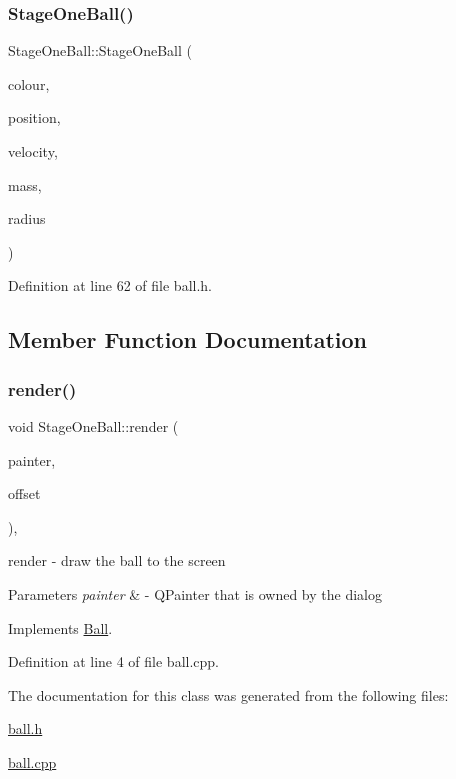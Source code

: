 \subsubsection{\texorpdfstring{Stage\+One\+Ball()}{StageOneBall()}}
{\footnotesize\ttfamily Stage\+One\+Ball\+::\+Stage\+One\+Ball (\begin{DoxyParamCaption}\item[{Q\+Color}]{colour,  }\item[{Q\+Vector2D}]{position,  }\item[{Q\+Vector2D}]{velocity,  }\item[{double}]{mass,  }\item[{int}]{radius }\end{DoxyParamCaption})\hspace{0.3cm}{\ttfamily [inline]}}



Definition at line 62 of file ball.\+h.



\subsection{Member Function Documentation}
\mbox{\label{class_stage_one_ball_aa4f7f52cb8946b59c201d724dc0dc5bd}} 
\subsubsection{\texorpdfstring{render()}{render()}}
{\footnotesize\ttfamily void Stage\+One\+Ball\+::render (\begin{DoxyParamCaption}\item[{Q\+Painter \&}]{painter,  }\item[{const Q\+Vector2D \&}]{offset }\end{DoxyParamCaption})\hspace{0.3cm}{\ttfamily [override]}, {\ttfamily [virtual]}}



render -\/ draw the ball to the screen 


\begin{DoxyParams}{Parameters}
{\em painter} & -\/ Q\+Painter that is owned by the dialog \\
\hline
\end{DoxyParams}


Implements \mbox{\hyperlink{class_ball_a307773aaa59aee90cef8767b0c22deca}{Ball}}.



Definition at line 4 of file ball.\+cpp.



The documentation for this class was generated from the following files\+:\begin{DoxyCompactItemize}
\item 
\mbox{\hyperlink{ball_8h}{ball.\+h}}\item 
\mbox{\hyperlink{ball_8cpp}{ball.\+cpp}}\end{DoxyCompactItemize}
